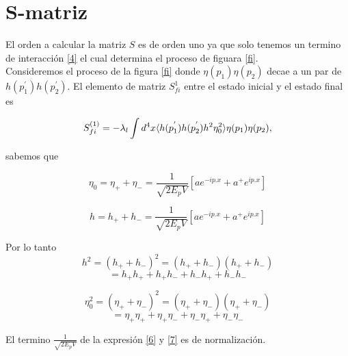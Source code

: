 \section{S-matriz}
 El orden a calcular la matriz $S$ es de orden uno ya que solo tenemos un termino de interacción \ref{4} el cual  determina el proceso de figuara \ref{fi}.\\
 Consideremos el proceso de la figura \ref{fi} donde $\eta(p_{1})\eta(p_{2})$ decae a un par de $h(p_{1}^{'})h(p_{2}^{'})$.
 El elemento de matriz $S_{fi}^{1}$ entre el estado inicial  y el estado final es 
 
 \begin{equation}
S_{fi}^{(1)}=-\lambda_{l}\int d^{4}x\langle{h(p_{1}^{'})h(p_{2}^{'})}h^{2}\eta_{0}^{2}\rangle{\eta(p_{1})\eta(p_{2})}, 
 \label{5}
 \end{equation}
 
 sabemos que
 
 \begin{equation}
\eta_{0}=\eta_{+}+\eta_{-}=\frac{1}{\sqrt{2E_{p}V}}\left[ae^{-ip.x}+a^{+}e^{ip.x}\right]
 \label{6}
 \end{equation}

\begin{equation}
h=h_{+}+h_{-}=\frac{1}{\sqrt{2E_{p}V}}\left[ae^{-ip.x}+a^{+}e^{ip.x}\right]
 \label{7}
 \end{equation}


Por lo tanto
\begin{equation*}
h^{2}=\left(h_{+}+h_{-}\right)^{2}=(h_{+}+h_{-})(h_{+}+h_{-})
\end{equation*}
 \begin{equation}
=h_{+}h_{+}+h_{+}h_{-}+h_{-}h_{+}+h_{-}h_{-}
 \label{8}
 \end{equation}

\begin{equation*}
\eta_{0}^{2}=\left(\eta_{+}+\eta_{-}\right)^{2}=(\eta_{+}+\eta_{-})(\eta_{+}+\eta_{-})
\end{equation*}
\begin{equation}
=\eta_{+}\eta_{+}+\eta_{+}\eta_{-}+\eta_{-}\eta_{+}+\eta_{-}\eta_{-}
\label{9}
\end{equation}

El termino $\frac{1}{\sqrt{2E_{p}V}}$ de la expresión \ref{6} y \ref{7} es de normalización.\\

